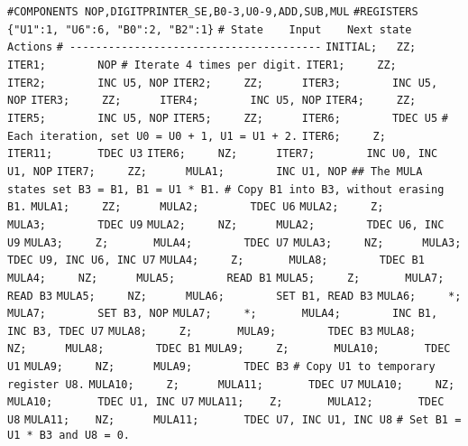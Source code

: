 \begin{apgsembly}
	\centering
	\begin{minipage}[t]{.49\textwidth}
		\begin{algorithmic}\tiny
			\State \verb|#COMPONENTS NOP,DIGITPRINTER_SE,B0-3,U0-9,ADD,SUB,MUL|
			\State \verb|#REGISTERS {"U1":1, "U6":6, "B0":2, "B2":1}|
			\State \verb|# State    Input    Next state    Actions|
			\State \verb|# ---------------------------------------|
			\State \verb|INITIAL;   ZZ;      ITER1;        NOP|
			\State \verb||
			\State \verb|# Iterate 4 times per digit.|
			\State \verb|ITER1;     ZZ;      ITER2;        INC U5, NOP|
			\State \verb|ITER2;     ZZ;      ITER3;        INC U5, NOP|
			\State \verb|ITER3;     ZZ;      ITER4;        INC U5, NOP|
			\State \verb|ITER4;     ZZ;      ITER5;        INC U5, NOP|
			\State \verb|ITER5;     ZZ;      ITER6;        TDEC U5|
			\State \verb||
			\State \verb|# Each iteration, set U0 = U0 + 1, U1 = U1 + 2.|
			\State \verb|ITER6;     Z;       ITER11;       TDEC U3|
			\State \verb|ITER6;     NZ;      ITER7;        INC U0, INC U1, NOP|
			\State \verb|ITER7;     ZZ;      MULA1;        INC U1, NOP|
			\State \verb||
			\State \verb|## The MULA states set B3 = B1, B1 = U1 * B1.|
			\State \verb|# Copy B1 into B3, without erasing B1.|
			\State \verb|MULA1;     ZZ;      MULA2;        TDEC U6|
			\State \verb|MULA2;     Z;       MULA3;        TDEC U9|
			\State \verb|MULA2;     NZ;      MULA2;        TDEC U6, INC U9|
			\State \verb|MULA3;     Z;       MULA4;        TDEC U7|
			\State \verb|MULA3;     NZ;      MULA3;        TDEC U9, INC U6, INC U7|
			\State \verb|MULA4;     Z;       MULA8;        TDEC B1|
			\State \verb|MULA4;     NZ;      MULA5;        READ B1|
			\State \verb|MULA5;     Z;       MULA7;        READ B3|
			\State \verb|MULA5;     NZ;      MULA6;        SET B1, READ B3|
			\State \verb|MULA6;     *;       MULA7;        SET B3, NOP|
			\State \verb|MULA7;     *;       MULA4;        INC B1, INC B3, TDEC U7|
			\State \verb|MULA8;     Z;       MULA9;        TDEC B3|
			\State \verb|MULA8;     NZ;      MULA8;        TDEC B1|
			\State \verb|MULA9;     Z;       MULA10;       TDEC U1|
			\State \verb|MULA9;     NZ;      MULA9;        TDEC B3|
			\State \verb||
			\State \verb|# Copy U1 to temporary register U8.|
			\State \verb|MULA10;     Z;      MULA11;       TDEC U7|
			\State \verb|MULA10;     NZ;     MULA10;       TDEC U1, INC U7|
			\State \verb|MULA11;    Z;       MULA12;       TDEC U8|
			\State \verb|MULA11;    NZ;      MULA11;       TDEC U7, INC U1, INC U8|
			\State \verb||
			\State \verb|# Set B1 = U1 * B3 and U8 = 0.|

\end{algorithmic}
\end{minipage}
\end{apgsembly}
